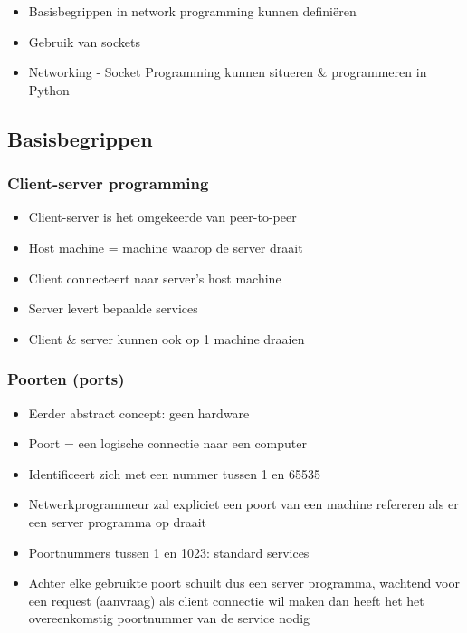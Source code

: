 \documentclass{article}
\begin{document}
\begin{itemize}
    \item Basisbegrippen in network programming kunnen definiëren
    \item Gebruik van sockets
    \item Networking - Socket Programming kunnen situeren \& programmeren in Python
\end{itemize}

\subsection{Basisbegrippen}

\subsubsection{Client-server programming}

\begin{itemize}
    \item Client-server is het omgekeerde van peer-to-peer
    \item Host machine = machine waarop de server draait
    \item Client connecteert naar server's host machine
    \item Server levert bepaalde services   
    \item Client \& server kunnen ook op 1 machine draaien
\end{itemize}

\subsubsection{Poorten (ports)}

\begin{itemize}
    \item Eerder abstract concept: geen hardware
    \item Poort = een logische connectie naar een computer
    \item Identificeert zich met een nummer tussen 1 en 65535
    \item Netwerkprogrammeur zal expliciet een poort van een machine refereren als er een server programma op draait
    \item Poortnummers tussen 1 en 1023: standard services
    \item Achter elke gebruikte poort schuilt dus een server programma, wachtend voor een request (aanvraag) als client connectie wil maken dan heeft het het overeenkomstig poortnummer van de service nodig
\end{itemize}
\end{document}
